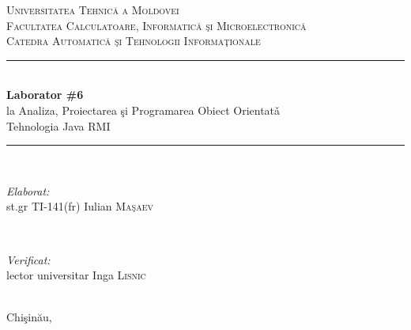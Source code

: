 \documentclass[12pt]{article}
\begin{document}
\begin{titlepage}

\newcommand{\HRule}{\rule{\linewidth}{0.5mm}} 

\center 
 

\textsc{\LARGE Universitatea Tehnic\u{a} a Moldovei}\\[0.8cm] 
\textsc{\Large Facultatea Calculatoare, Informatic\u{a} \c{s}i Microelectronic\u{a}}\\[0.5cm] 
\textsc{\large Catedra Automatic\u{a} \c{s}i Tehnologii Informa\c{t}ionale}\\[5.2cm] 


\HRule \\[0.4cm]
{ \huge \bfseries Laborator \#6}\\[0.3cm]
{\large la Analiza, Proiectarea \c{s}i Programarea Obiect Orientat\v{a}}\\
{\large Tehnologia Java RMI}\\[0.4cm] 
\HRule \\[5.5cm]
 

\begin{minipage}{0.4\textwidth}
\begin{flushleft} \large
\emph{Elaborat:}\\
st.gr TI-141(fr) Iulian \textsc{Ma\c{s}aev} 
\end{flushleft}
\end{minipage}
~
\begin{minipage}{0.4\textwidth}
\begin{flushright} \large
\emph{Verificat:} \\
lector universitar Inga \textsc{Lisnic} 
\end{flushright}
\end{minipage}\\[4cm]


\vfill 
{\large Chi\c{s}in\u{a}u, \the\year}\\[3cm] 



\end{titlepage}

%


%


\end{document}
